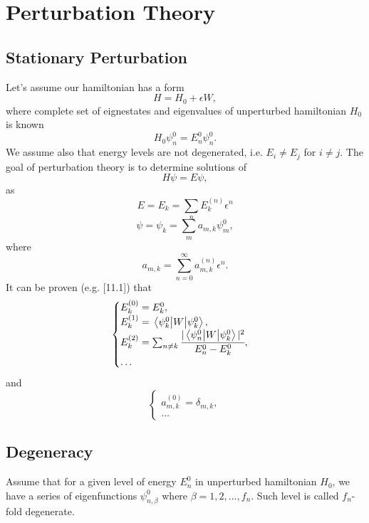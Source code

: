 \documentclass[main.tex]{subfiles}
\begin{document}
\section{Perturbation Theory}
\subsection{Stationary Perturbation}
Let's assume our hamiltonian has a form
\begin{equation}
H = H_0 + \epsilon W,
\end{equation}
where complete set of eignestates and eigenvalues of unperturbed hamiltonian $H_0$ is known
\begin{equation}
H_0 \psi^0_n = E^0_n \psi^0_n.
\end{equation}
We assume also that energy levels are not degenerated, i.e.
$E_i \not= E_j$ for $i\not=j$.
The goal of perturbation theory is to determine solutions of 
\begin{equation}
H\psi = E \psi,
\end{equation}
as
\begin{equation}
E = E_k = \sum_{n} E^{(n)}_k\epsilon^n
\end{equation} 
\begin{equation}
\psi = \psi_k = \sum_{m}a_{m,k} \psi_m^0, 
\end{equation}
where 
\begin{equation}
a_{m,k} = \sum_{n=0}^\infty a^{(n)}_{m,k} \epsilon^n. 
\end{equation}
It can be proven (e.g. \cite{walter-greiner2001}[11.1]) that
\begin{equation}
\begin{cases}
E_k^{(0)} = E^0_k, \\
E_k^{(1)} = \mel{\psi_k^0}{W}{\psi_k^0},\\
E_k^{(2)} = \sum_{n\not=k} \cfrac{|\mel{\psi_n^0}{W}{\psi_k^0}|^2}{E^0_n - E^0_k},\\
\dots
\end{cases}
\end{equation}
and
\begin{equation}
\begin{cases}
a^{(0)}_{m, k} = \delta_{m,k},\\
\dots
\end{cases}
\end{equation}
\subsection{Degeneracy}
Assume that for a given level of energy $E^0_n$ in unperturbed hamiltonian $H_0$, we have a series of eigenfunctions $\psi^0_{n,\beta}$ where $\beta=1,2, ..., f_n$. Such level is called $f_n$-fold degenerate.
\end{document}
